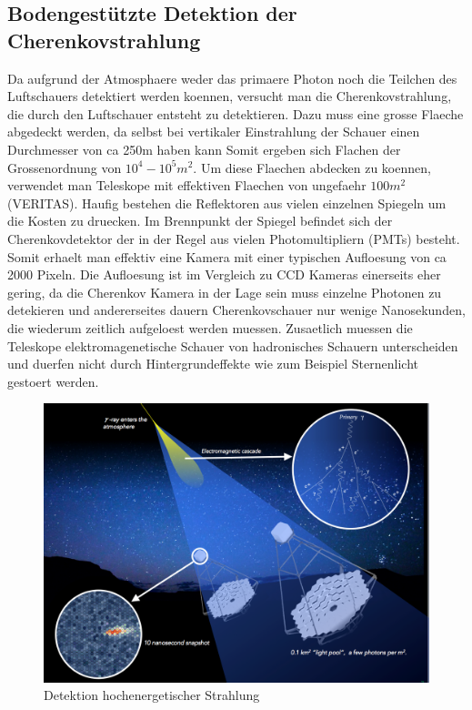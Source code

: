 \subsection{Bodengestützte Detektion der Cherenkovstrahlung}
Da aufgrund der Atmosphaere weder das primaere Photon noch die Teilchen des Luftschauers detektiert werden koennen, versucht man die Cherenkovstrahlung, die durch den Luftschauer entsteht zu detektieren. Dazu muss eine grosse Flaeche abgedeckt werden, da selbst bei vertikaler Einstrahlung der Schauer einen Durchmesser von ca 250m haben kann %
Somit ergeben sich Flachen der Grossenordnung von $10^4-10^5 m^2$. Um diese Flaechen abdecken zu koennen, verwendet man Teleskope mit effektiven Flaechen von ungefaehr $100 m^2$ (VERITAS). Haufig bestehen die Reflektoren aus vielen einzelnen Spiegeln um die Kosten zu druecken. Im Brennpunkt der Spiegel befindet sich der Cherenkovdetektor der in der Regel aus vielen Photomultipliern (PMTs) besteht. Somit erhaelt man effektiv eine Kamera mit einer typischen Aufloesung von ca 2000 Pixeln. Die Aufloesung ist im Vergleich zu CCD Kameras einerseits eher gering, da die Cherenkov Kamera in der Lage sein muss einzelne Photonen zu detekieren und andererseites dauern Cherenkovschauer nur wenige Nanosekunden, die wiederum zeitlich aufgeloest werden muessen. Zusaetlich muessen die Teleskope elektromagenetische Schauer von hadronisches Schauern unterscheiden und duerfen nicht durch Hintergrundeffekte wie zum Beispiel Sternenlicht gestoert werden.

\begin{figure}[htbp]
\centering
\includegraphics[width=\textwidth]{Images/detection.png}
\caption{Detektion hochenergetischer Strahlung}
\label{img:detection}
\end{figure}
